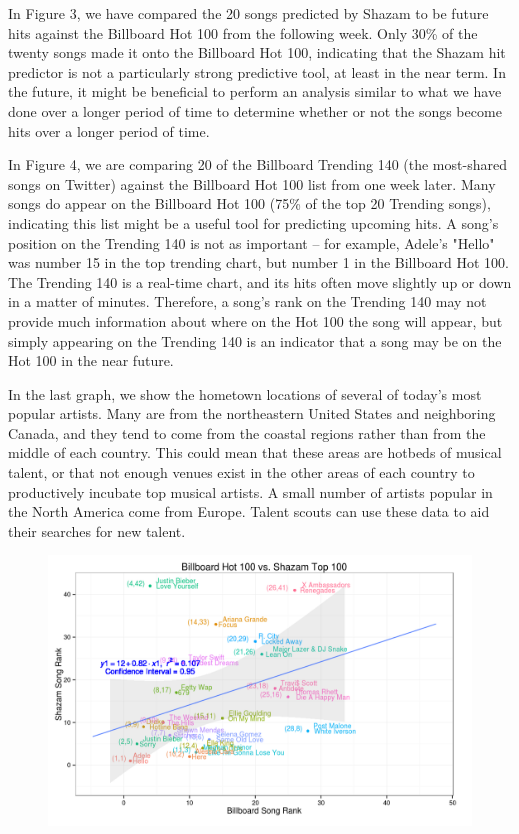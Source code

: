 \documentclass{article}
\begin{document}
\noindent
In Figure 3, we have compared the 20 songs predicted by Shazam to be future hits against the Billboard Hot 100 from the following week. Only 30\% of the twenty songs made it onto the Billboard Hot 100, indicating that the Shazam hit predictor is not a particularly strong predictive tool, at least in the near term. In the future, it might be beneficial to perform an analysis similar to what we have done over a longer period of time to determine whether or not the songs become hits over a longer period of time.\vspace{2mm}

\noindent
In Figure 4, we are comparing 20 of the Billboard Trending 140 (the most-shared songs on Twitter) against the Billboard Hot 100 list from one week later. Many songs do appear on the Billboard Hot 100 (75\% of the top 20 Trending songs), indicating this list might be a useful tool for predicting upcoming hits. A song's position on the Trending 140 is not as important -- for example, Adele's "Hello" was number 15 in the top trending chart, but number 1 in the Billboard Hot 100. The Trending 140 is a real-time chart, and its hits often move slightly up or down in a matter of minutes. Therefore, a song's rank on the Trending 140 may not provide much information about where on the Hot 100 the song will appear, but simply appearing on the Trending 140 is an indicator that a song may be on the Hot 100 in the near future.\vspace{2mm}  

\noindent
In the last graph, we show the hometown locations of several of today's most popular artists. Many are from the northeastern United States and neighboring Canada, and they tend to come from the coastal regions rather than from the middle of each country. This could mean that these areas are hotbeds of musical talent, or that not enough venues exist in the other areas of each country to productively incubate top musical artists. A small number of artists popular in the North America come from Europe. Talent scouts can use these data to aid their searches for new talent. 

\begin{figure}[hp]
  \centering
    \includegraphics[scale=0.5]{2}
\end{figure}
\end{document}
